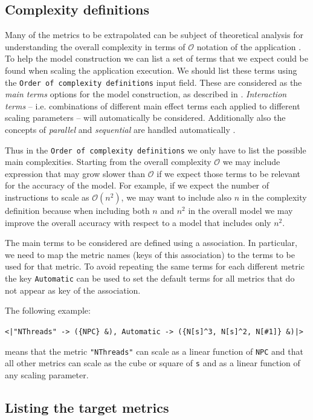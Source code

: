 \documentclass[a4paper, 10pt]{article}
\begin{document}
\subsection{Complexity definitions}
\label{sed:complexities}

Many of the metrics to be extrapolated can be subject of theoretical analysis for understanding the overall complexity in terms
of $\mathcal{O}$ notation of the application \cite{mariani2016ijpp}. To help the model construction we can list a set of terms that we
expect could be found when scaling the application execution. We should list these terms using the \verb!Order of complexity definitions!
input field. These are considered as the \textit{main terms} options for the model construction, as described in \cite{mariani2016ijpp}.
\textit{Interaction terms} -- i.e. combinations of different main effect terms each applied to different scaling parameters --
will automatically be considered. Additionally also the concepts of
\textit{parallel} and \textit{sequential} are handled automatically \cite{mariani2016ijpp}.

Thus in the \verb!Order of complexity definitions! we only have to list the possible main complexities. Starting from the overall
complexity $\mathcal{O}$ we may include expression that may grow slower than $\mathcal{O}$ if we expect those terms to be relevant
for the accuracy of the model. For example, if we expect the number of instructions to scale as $\mathcal{O}(n^2)$, we may want to include also
$n$ in the complexity definition because when including both $n$ and $n^2$ in the overall model we may improve the
overall accuracy with respect to a model that includes only $n^2$.

The main terms to be considered are defined using a \mathe association. In particular, we need to map the metric names (keys of this association)
to the terms to be used for that metric. To avoid repeating the same terms for each different metric
the key \verb!Automatic! can be used to set the default terms for all metrics that do not appear as key of the association.

The following example:

\verb!<|"NThreads" -> ({NPC} &), Automatic -> ({N[s]^3, N[s]^2, N[#1]} &)|>!

means that the metric \verb!"NThreads"! can scale as a linear function of \verb!NPC! and that all other metrics can scale
as the cube or square of \verb!s! and as a linear function of any scaling parameter.

\subsection{Listing the target metrics}
\label{sec:mListEdit}
\end{document}
